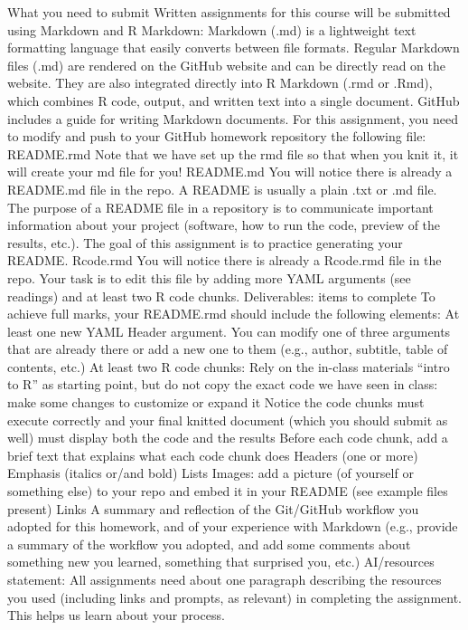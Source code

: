 \begin{userprompt}
What you need to submit
Written assignments for this course will be submitted using Markdown and R Markdown: Markdown (.md) is a lightweight text formatting language that easily converts between file formats. Regular Markdown files (.md) are rendered on the GitHub website and can be directly read on the website. They are also integrated directly into R Markdown (.rmd or .Rmd), which combines R code, output, and written text into a single document. GitHub includes a guide for writing Markdown documents.
For this assignment, you need to modify and push to your GitHub homework repository the following file: README.rmd Note that we have set up the rmd file so that when you knit it, it will create your md file for you!
README.md
You will notice there is already a README.md file in the repo. A README is usually a plain .txt or .md file. The purpose of a README file in a repository is to communicate important information about your project (software, how to run the code, preview of the results, etc.). The goal of this assignment is to practice generating your README.
Rcode.rmd
You will notice there is already a Rcode.rmd file in the repo. Your task is to edit this file by adding more YAML arguments (see readings) and at least two R code chunks.
Deliverables: items to complete
To achieve full marks, your README.rmd should include the following elements:
At least one new YAML Header argument. You can modify one of three arguments that are already there or add a new one to them (e.g., author, subtitle, table of contents, etc.)
At least two R code chunks:
Rely on the in-class materials “intro to R” as starting point, but do not copy the exact code we have seen in class: make some changes to customize or expand it
Notice the code chunks must execute correctly and your final knitted document (which you should submit as well) must display both the code and the results
Before each code chunk, add a brief text that explains what each code chunk does
Headers (one or more)
Emphasis (italics or/and bold)
Lists
Images: add a picture (of yourself or something else) to your repo and embed it in your README (see example files present)
Links
A summary and reflection of the Git/GitHub workflow you adopted for this homework, and of your experience with Markdown (e.g., provide a summary of the workflow you adopted, and add some comments about something new you learned, something that surprised you, etc.)
AI/resources statement: All assignments need about one paragraph describing the resources you used (including links and prompts, as relevant) in completing the assignment. This helps us learn about your process.

\end{userprompt}
